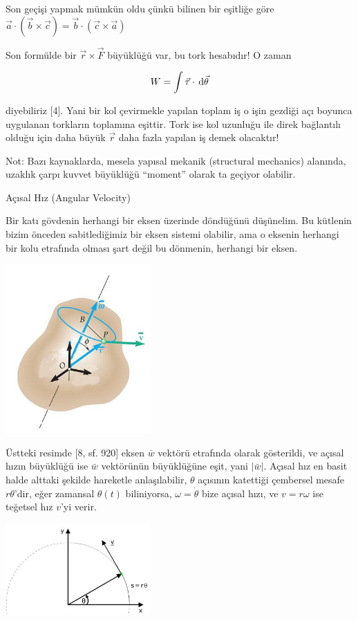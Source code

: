 \documentclass[12pt,fleqn]{article}\usepackage{../../common}
\begin{document}
Son geçişi yapmak mümkün oldu çünkü bilinen bir eşitliğe göre
$\vec{a} \cdot (\vec{b} \times \vec{c}) = \vec{b} \cdot (\vec{c} \times \vec{a})$

Son formülde bir $\vec{r}  \times \vec{F}$ büyüklüğü var, bu tork hesabıdır! O
zaman

$$
W = \int  \vec{\tau} \cdot \,\mathrm{d} \vec{\theta}
$$

diyebiliriz [4]. Yani bir kol çevirmekle yapılan toplam iş o işin gezdiği
açı boyunca uygulanan torkların toplamına eşittir. Tork ise kol uzunluğu
ile direk bağlantılı olduğu için daha büyük $\vec{r}$ daha fazla yapılan
iş demek olacaktır!

Not: Bazı kaynaklarda, mesela yapısal mekanik (structural mechanics) alanında,
uzaklık çarpı kuvvet büyüklüğü ``moment'' olarak ta geçiyor olabilir.

Açısal Hız (Angular Velocity)

Bir katı gövdenin herhangi bir eksen üzerinde döndüğünü düşünelim.  Bu kütlenin
bizim önceden sabitlediğimiz bir eksen sistemi olabilir, ama o eksenin herhangi
bir kolu etrafında olması şart değil bu dönmenin, herhangi bir eksen.

\includegraphics[width=15em]{phy_005_basics_02_14.jpg}

Üstteki resimde [8, sf. 920] eksen $\bar{w}$ vektörü etrafında olarak
gösterildi, ve açısal hızın büyüklüğü ise $\bar{w}$ vektörünün büyüklüğüne eşit,
yani $|\bar{w}|$.  Açısal hız en basit halde alttaki şekilde hareketle
anlaşılabilir, $\theta$ açısının katettiği çembersel mesafe $r\theta$'dir, eğer
zamansal $\theta(t)$ biliniyorsa, $\omega = \dot{\theta}$ bize açısal hızı, ve
$v = r\omega$ ise teğetsel hız $v$'yi verir.

\includegraphics[width=15em]{phy_005_basics_02_15.jpg}
\end{document}
